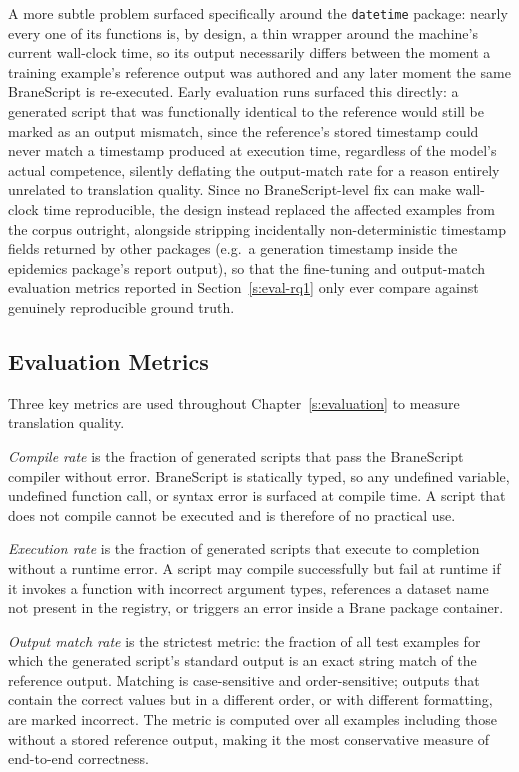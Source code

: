 A more subtle problem surfaced specifically around the \texttt{datetime}
package: nearly every one of its functions is, by design, a thin wrapper
around the machine's current wall-clock time, so its output necessarily
differs between the moment a training example's reference output was
authored and any later moment the same BraneScript is re-executed. Early
evaluation runs surfaced this directly: a generated script that was
functionally identical to the reference would still be marked as an output
mismatch, since the reference's stored timestamp could never match a
timestamp produced at execution time, regardless of the model's actual
competence, silently deflating the output-match rate for a reason entirely
unrelated to translation quality. Since no BraneScript-level fix can make
wall-clock time reproducible, the design instead replaced the affected
examples from the corpus outright, alongside stripping incidentally
non-deterministic timestamp fields returned by other packages (e.g.\ a
generation timestamp inside the epidemics package's report output), so that
the fine-tuning and output-match evaluation metrics reported in
Section~\ref{s:eval-rq1} only ever compare against genuinely reproducible
ground truth.

\subsection{Evaluation Metrics}\label{s:eval-metrics}

Three key metrics are used throughout Chapter~\ref{s:evaluation} to measure
translation quality.

\emph{Compile rate} is the fraction of generated scripts that pass the
BraneScript compiler without error. BraneScript is statically typed, so any
undefined variable, undefined function call, or syntax error is surfaced at
compile time. A script that does not compile cannot be executed and is
therefore of no practical use.

\emph{Execution rate} is the fraction of generated scripts that execute to
completion without a runtime error. A script may compile successfully but fail
at runtime if it invokes a function with incorrect argument types, references
a dataset name not present in the registry, or triggers an error inside a
Brane package container.

\emph{Output match rate} is the strictest metric: the fraction of all test
examples for which the generated script's standard output is an exact string
match of the reference output. Matching is case-sensitive and order-sensitive;
outputs that contain the correct values but in a different order, or with
different formatting, are marked incorrect. The metric is computed over all
examples including those without a stored reference output, making it the most
conservative measure of end-to-end correctness.

